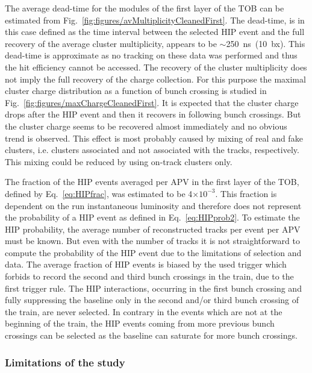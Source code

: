 The average dead-time for the modules of the first layer of the TOB can be estimated from Fig.~\ref{fig:figures/avMultiplicityCleanedFirst}. The dead-time, is in this case defined as the time interval between the selected HIP event and the full recovery of the average cluster multiplicity, appears to be $\sim$250~ns~(10~bx). This dead-time is approximate as no tracking on these data was performed and thus the hit efficiency cannot be accessed. The recovery of the cluster multiplicity does not imply the full recovery of the charge collection. For this purpose the maximal cluster charge distribution as a function of bunch crossing is studied in Fig.~\ref{fig:figures/maxChargeCleanedFirst}. It is expected that the cluster charge drops after the HIP event and then it recovers in following bunch crossings. But the cluster charge seems to be recovered almost immediately and no obvious trend is observed. This effect is most probably caused by mixing of real and fake clusters, i.e. clusters associated and not associated with the tracks, respectively. This mixing could be reduced by using on-track clusters only.

The fraction of the HIP events averaged per APV in the first layer of the TOB, defined by Eq.~\ref{eq:HIPfrac}, was estimated to be 4$\times 10^{-3}$. This fraction is dependent on the run instantaneous luminosity and therefore does not represent the probability of a HIP event as defined in Eq.~\ref{eq:HIPprob2}. To estimate the HIP probability, the average number of reconstructed tracks per event per APV must be known. But even with the number of tracks it is not straightforward to compute the probability of the HIP event due to the limitations of selection and data. The average fraction of HIP events is biased by the used trigger which forbids to record the second and third bunch crossings in the train, due to the first trigger rule. The HIP interactions, occurring in the first bunch crossing and fully suppressing the baseline only in the second and/or third bunch crossing of the train, are never selected. In contrary in the events which are not at the beginning of the train, the HIP events coming from more previous bunch crossings can be selected as the baseline can saturate for more bunch crossings.
 

\subsubsection{Limitations of the study~\label{sec:limitationsSelection}}

